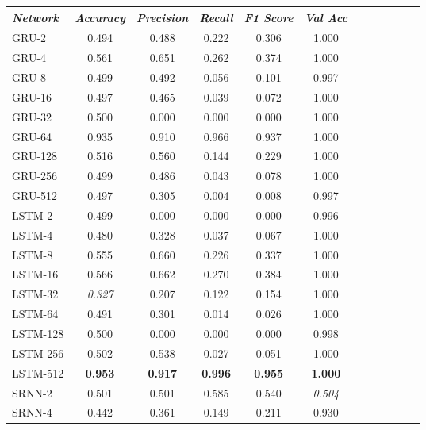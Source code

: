 \begin{table}
\begin{tabularx}{\textwidth}{@{}l*{10}{C}c@{}}
\toprule
  \textit{Network} &  \textit{Accuracy} &  \textit{Precision} &  \textit{Recall} &  \textit{F1 Score} &  \textit{Val Acc} \\
\midrule
    GRU-2 &     0.494 &      0.488 &   0.222 &     0.306 &    1.000 \\
    GRU-4 &     0.561 &      0.651 &   0.262 &     0.374 &    1.000 \\
    GRU-8 &     0.499 &      0.492 &   0.056 &     0.101 &    0.997 \\
   GRU-16 &     0.497 &      0.465 &   0.039 &     0.072 &    1.000 \\
   GRU-32 &     0.500 &      0.000 &   0.000 &     0.000 &    1.000 \\
   GRU-64 &     0.935 &      0.910 &   0.966 &     0.937 &    1.000 \\
  GRU-128 &     0.516 &      0.560 &   0.144 &     0.229 &    1.000 \\
  GRU-256 &     0.499 &      0.486 &   0.043 &     0.078 &    1.000 \\
  GRU-512 &     0.497 &      0.305 &   0.004 &     0.008 &    0.997 \\
   LSTM-2 &     0.499 &      0.000 &   0.000 &     0.000 &    0.996 \\
   LSTM-4 &     0.480 &      0.328 &   0.037 &     0.067 &    1.000 \\
   LSTM-8 &     0.555 &      0.660 &   0.226 &     0.337 &    1.000 \\
  LSTM-16 &     0.566 &      0.662 &   0.270 &     0.384 &    1.000 \\
  LSTM-32 &     \textit{0.327} &      0.207 &   0.122 &     0.154 &    1.000 \\
  LSTM-64 &     0.491 &      0.301 &   0.014 &     0.026 &    1.000 \\
 LSTM-128 &     0.500 &      0.000 &   0.000 &     0.000 &    0.998 \\
 LSTM-256 &     0.502 &      0.538 &   0.027 &     0.051 &    1.000 \\
 LSTM-512 &     \textbf{0.953} &      \textbf{0.917} &   \textbf{0.996} &     \textbf{0.955} &    \textbf{1.000} \\
   SRNN-2 &     0.501 &      0.501 &   0.585 &     0.540 &    \textit{0.504} \\
   SRNN-4 &     0.442 &      0.361 &   0.149 &     0.211 &    0.930 \\

\end{tabularx}
\end{table}
